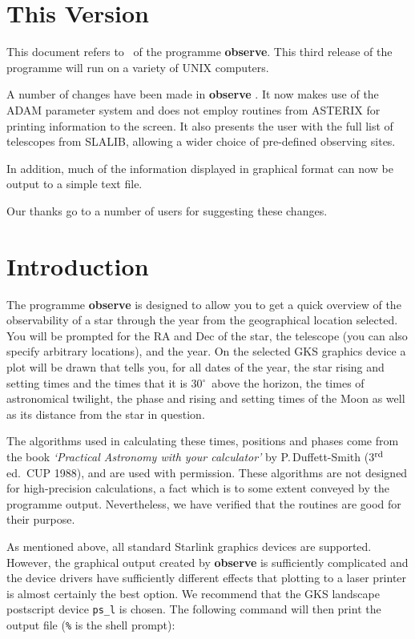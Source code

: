 \documentclass[11pt,noabs]{starlink}
\providecommand{\degrees}{\hbox{$^\circ$}}
\begin{document}
\scfrontmatter

\section{This Version}
\label{sec:version}

This document refers to \stardocversion\ of the programme {\bf{observe}}.
This third release of the programme will run on a variety of UNIX
computers.

A number of changes have been made in {\bf{observe}} \stardocversion.
It now makes use of the ADAM parameter system and does not employ
routines from \textsc{ASTERIX} for printing information to the screen. It
also presents the user with the full list of telescopes from SLALIB,
allowing a wider choice of pre-defined observing sites.

In addition, much of the information displayed in graphical format
can now be output to a simple text file.

Our thanks go to a number of users for suggesting these changes.

\section{Introduction}
\label{sec:introduction}

The programme {\bf{observe}} is designed to allow you to get a quick
overview of the observability of a star through the year from the
geographical location selected. You will be prompted for the RA and Dec
of the star, the telescope (you can also specify arbitrary locations),
and the year. On the selected GKS graphics device a plot will be drawn
that tells you, for all dates of the year, the star rising and setting
times and the times that it is 30\degrees\ above the  horizon, the
times of astronomical twilight, the phase and rising and setting  times
of the Moon as well as its distance from the star in question.

The algorithms used in calculating these times, positions and phases
come from the book {\em{`Practical Astronomy with your calculator'}}  by
P.\,Duffett-Smith (3$^{\rm rd}$ ed.~CUP 1988), and are used with
permission. These algorithms are not designed for high-precision
calculations, a fact which is to some extent conveyed by the programme
output. Nevertheless, we have verified that the routines are good for
their purpose.

As mentioned above, all standard Starlink graphics devices are
supported.  However, the graphical output created by {\bf{observe}} is
sufficiently complicated and the device drivers have sufficiently
different effects that plotting to a laser printer is almost certainly
the best option. We recommend that the GKS landscape postscript device
{\tt{ps\_l}} is chosen.  The following command will then print the
output file ({\tt{\%}} is the shell prompt):
\end{document}
